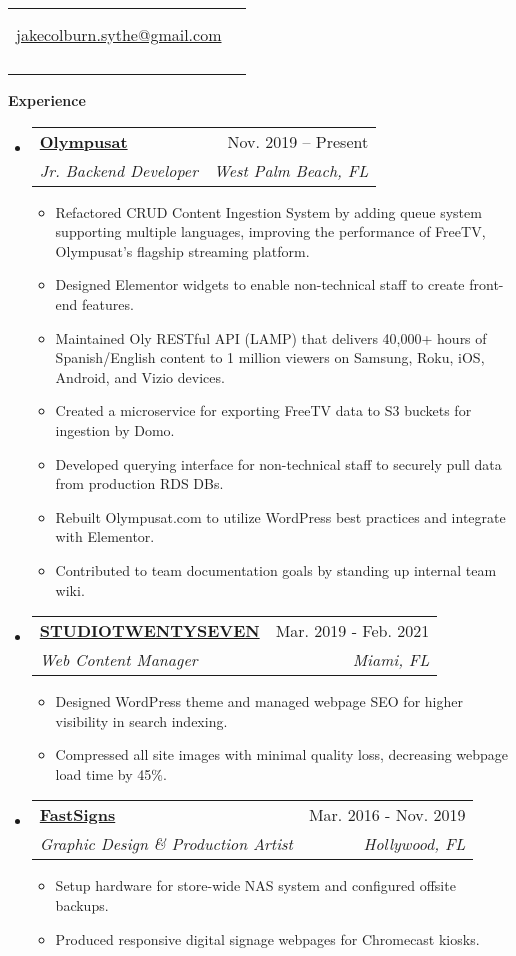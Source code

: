 \documentclass[letterpaper,10pt]{article}[leftmargin=*]
\makeatletter
\def \fullname {Jake Colburn}
\def \subtitle {}
\def \linkedinicon {\faLinkedin}
\def \linkedinlink {https://www.linkedin.com/in/jake-colburn-71401811/}
\def \linkedintext {/jake-colburn}
\def \phoneicon {\faPhone}
\def \phonetext {512-612-6131}
\def \emailicon {\faEnvelope}
\def \emaillink {mailto:jakecolburn.sythe@gmail.com}
\def \emailtext {jakecolburn.sythe@gmail.com}
\def \headertype {\singlecol} %
\def \entryspacing {-0pt}
\def \linkedin {\linkedinicon \hspace{3pt}\href{\linkedinlink}{\linkedintext}}
\def \phone {\phoneicon \hspace{3pt}{ \phonetext}}
\def \email {\emailicon \hspace{3pt}\href{\emaillink}{\emailtext}}
\renewcommand{\section}[2]{\vspace{5pt}
  \colorbox{secondary}{\color{white}\raggedbottom\normalsize\textbf{{#1}{\hspace{7pt}#2}}}
}
\newcommand{\resumeEntryStart}{\begin{itemize}[leftmargin=2.5mm]}
\newcommand{\resumeEntryEnd}{\end{itemize}\vspace{\entryspacing}}
\newcommand{\resumeItemListStart}{\begin{itemize}[leftmargin=4.5mm]}
\newcommand{\resumeItemListEnd}{\end{itemize}}
\newcommand{\resumeItem}[1]{
  \item\small{
    {#1 \vspace{-2pt}}
  }
}
\newcommand{\resumeEntryTSDL}[4]{
  \vspace{-1pt}\item[]
    \begin{tabularx}{0.97\textwidth}{X@{\hspace{60pt}}r}
      \textbf{\color{primary}#1} & {\firabook\color{accent}\small#2} \\
      \textit{\color{accent}\small#3} & \textit{\color{accent}\small#4} \\
    \end{tabularx}\vspace{-6pt}
}
\newcommand{\doublecol}[6]{
  \begin{tabularx}{\textwidth}{Xr}
    {
      \begin{tabular}[c]{l}
        \fontsize{35}{45}\selectfont{\color{primary}{{\textbf{\fullname}}}} \\
        {\textit{\subtitle}} %
      \end{tabular}
    } & {
      \begin{tabular}[c]{l@{\hspace{1.5em}}l}
        {\small#4} & {\small#1} \\
        {\small#5} & {\small#2} \\
        {\small#6} & {\small#3}
      \end{tabular}
    }
  \end{tabularx}
}
\newcommand{\singlecol}[6]{
  \begin{tabularx}{\textwidth}{Xr}
    {
      \begin{tabular}[b]{l}
        \fontsize{35}{45}\selectfont{\color{primary}{{\textbf{\fullname}}}} \\
        {\textit{\subtitle}} %
      \end{tabular}
    } & {
      \begin{tabular}[c]{l}
        {\small#1} \\
        {\small#2} \\
        {\small#3} \\
        {\small#4} \\
        {\small#5} \\
        {\small#6}
      \end{tabular}
    }
  \end{tabularx}
}
\makeatother
\begin{document}


\headertype{\linkedin}{\email}{}{\phone}{}{} %
\vspace{-10pt} %

\section{\faPieChart}{Experience}

  \resumeEntryStart
    \resumeEntryTSDL
      {\href{https://www.linkedin.com/company/olympusat/}{Olympusat}}{Nov. 2019 -- Present}
      {Jr. Backend Developer}{West Palm Beach, FL}
    \resumeItemListStart
      \resumeItem {Refactored CRUD Content Ingestion System by adding queue system supporting multiple languages, improving the performance of FreeTV, Olympusat’s flagship streaming platform.}
      \resumeItem {Designed Elementor widgets to enable non-technical staff to create front-end features.}
      \resumeItem {Maintained Oly RESTful API (LAMP) that delivers 40,000+ hours of Spanish/English content to 1 million viewers on Samsung, Roku, iOS, Android, and Vizio devices.}
        \resumeItem{Created a microservice for exporting FreeTV data to S3 buckets for ingestion by Domo.}
        \resumeItem{Developed querying interface for non-technical staff to securely pull data from production RDS DBs.}
        \resumeItem{Rebuilt Olympusat.com to utilize WordPress best practices and integrate with Elementor.}
        \resumeItem{Contributed to team documentation goals by standing up internal team wiki.}
    \resumeItemListEnd
  \resumeEntryEnd

  \resumeEntryStart
    \resumeEntryTSDL
      {\href{https://studiotwentyseven.com/}{STUDIOTWENTYSEVEN}}{Mar. 2019 - Feb. 2021}
      {Web Content Manager}{Miami, FL}
    \resumeItemListStart
      \resumeItem {Designed WordPress theme and managed webpage SEO for higher visibility in search indexing.}
      \resumeItem {Compressed all site images with minimal quality loss, decreasing webpage load time by 45\%.}
    \resumeItemListEnd
  \resumeEntryEnd

  \resumeEntryStart
    \resumeEntryTSDL
      {\href{https://www.fastsigns.com/hollywood-fl/}{FastSigns}}{Mar. 2016 - Nov. 2019}
      {Graphic Design \& Production Artist}{Hollywood, FL}
    \resumeItemListStart
      \resumeItem {Setup hardware for store-wide NAS system and configured offsite backups.}
      \resumeItem {Produced responsive digital signage webpages for Chromecast kiosks.}
    \resumeItemListEnd
  \resumeEntryEnd
\end{document}
